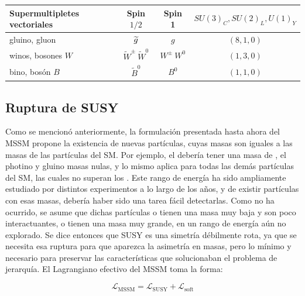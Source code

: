 \begin{table}[!ht]
	\begin{tabular}{ l c | c c c}

		\hline
		\hline

		\multicolumn{2}{l|}{Supermultipletes vectoriales} & Spin $1/2$ & Spin 1 & $SU(3)_C, SU(2)_L, U(1)_Y$ \\

		\hline
		\hline

		\multicolumn{2}{l|}{gluino, gluon} & $\widetilde{g}$ & $g$ & $(8, 1, 0)$ \\ [1ex]
		\multicolumn{2}{l|}{winos, bosones $W$} & $\widetilde{W}^{\pm}\ \widetilde{W}^{0}$ & $W^{\pm}\ W^0$ & $(1, 3, 0)$ \\ [1ex]
		\multicolumn{2}{l|}{bino, bosón $B$} & $\widetilde{B}^0$ & $B^0$ & $(1, 1, 0)$ \\ [1ex]

		\hline
		\hline

	\end{tabular}
	\renewcommand{\arraystretch}{1}

	\label{tab:mssm_particles}

\end{table}


\subsection{Ruptura de SUSY}

Como se mencionó anteriormente, la formulación presentada hasta ahora del MSSM propone la existencia de nuevas partículas, cuyas masas son iguales a las masas de las partículas del SM. Por ejemplo, el \selL debería tener una masa de , el photino y gluino masas nulas, y lo mismo aplica para todas las demás partículas del SM, las cuales no superan los . Este rango de energía ha sido ampliamente estudiado por distintos experimentos a lo largo de los años, y de existir partículas con esas masas, debería haber sido una tarea fácil detectarlas. Como no ha ocurrido, se asume que dichas partículas o tienen una masa muy baja y son poco interactuantes, o tienen una masa muy grande, en un rango de energía aún no explorado. Se dice entonces que SUSY es una simetría débilmente rota, ya que se necesita esa ruptura para que aparezca la asimetría en masas, pero lo mínimo y necesario para preservar las características que solucionaban el problema de jerarquía. El Lagrangiano efectivo del MSSM toma la forma:

\begin{equation}
	\mathcal{L}_{\text{MSSM}} = \mathcal{L}_{\text{SUSY}} + \mathcal{L}_{\text{soft}} 
	\label{eq:l_susy}
\end{equation}

